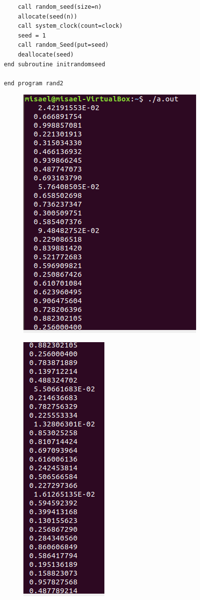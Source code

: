 \documentclass[12pt,a4paper]{article}
\begin{document}
\begin{enumerate}
\begin{verbatim}
	call random_seed(size=n)
	allocate(seed(n))
	call system_clock(count=clock)
	seed = 1
	call random_Seed(put=seed)
	deallocate(seed)	
end subroutine initrandomseed

end program rand2

    \end{verbatim}
    
    \begin{figure}[h!]
        \centering
        \includegraphics[scale=0.6]{3.1.PNG}
    \end{figure}
    
    \begin{figure}[h!]
        \centering
        \includegraphics[scale=0.6]{3.2.PNG}
    \end{figure}
    

\end{enumerate}
\end{document}
